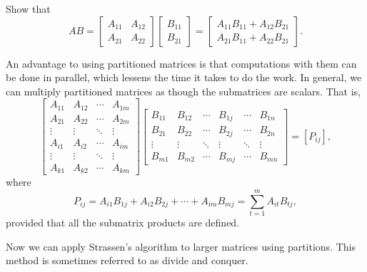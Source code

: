 \begin{pactivity}
Show that 
\[AB = \left[ \begin{array}{cc} A_{11}&A_{12} \\ A_{21}&A_{22} \end{array} \right] \left[ \begin{array}{c} B_{11}\\B_{21} \end{array} \right] = \left[ \begin{array}{cc} A_{11}B_{11}+A_{12}B_{21} \\ A_{21}B_{11}+A_{22}B_{21} \end{array} \right].\]


\end{pactivity}

An advantage to using partitioned matrices is that computations with them can be done in parallel, which lessens the time it takes to do the work. In general, we can multiply partitioned matrices as though the submatrices are scalars. That is,
\[ \left[ \begin{array}{cccc} A_{11}&A_{12}&\cdots&A_{1m} \\ A_{21}&A_{22}&\cdots&A_{2m}\\ \vdots & \vdots &\ddots & \vdots \\ A_{i1}&A_{i2}&\cdots&A_{im}  \\ \vdots & \vdots &\ddots & \vdots \\ A_{k1}&A_{k2}&\cdots&A_{km} \end{array} \right] \left[ \begin{array}{cccccc} B_{11}&B_{12}&\cdots&B_{1j} & \cdots &B_{1n} \\ B_{21}&B_{22}&\cdots&B_{2j}&\cdots &B_{2n}\\ \vdots & \vdots &\ddots & \vdots&\ddots&\vdots \\ B_{m1}&B_{m2}&\cdots&B_{mj} &\cdots &B_{mn}\end{array} \right] = [P_{ij}],\]
where
\[P_{ij} = A_{i1}B_{1j} + A_{i2}B_{2j} + \cdots + A_{im}B_{mj} = \sum_{t=1}^{m} A_{it}B_{tj},\]
provided that all the submatrix products are defined. 

Now we can apply Strassen's algorithm to larger matrices using partitions. This method is sometimes referred to as divide and conquer.

